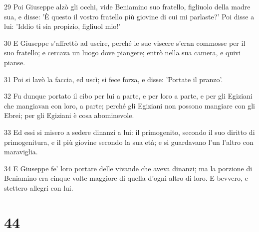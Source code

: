 \par 29 Poi Giuseppe alzò gli occhi, vide Beniamino suo fratello, figliuolo della madre sua, e disse: 'È questo il vostro fratello più giovine di cui mi parlaste?' Poi disse a lui: 'Iddio ti sia propizio, figliuol mio!'
\par 30 E Giuseppe s'affrettò ad uscire, perché le sue viscere s'eran commosse per il suo fratello; e cercava un luogo dove piangere; entrò nella sua camera, e quivi pianse.
\par 31 Poi si lavò la faccia, ed uscì; si fece forza, e disse: 'Portate il pranzo'.
\par 32 Fu dunque portato il cibo per lui a parte, e per loro a parte, e per gli Egiziani che mangiavan con loro, a parte; perché gli Egiziani non possono mangiare con gli Ebrei; per gli Egiziani è cosa abominevole.
\par 33 Ed essi si misero a sedere dinanzi a lui: il primogenito, secondo il suo diritto di primogenitura, e il più giovine secondo la sua età; e si guardavano l'un l'altro con maraviglia.
\par 34 E Giuseppe fe' loro portare delle vivande che aveva dinanzi; ma la porzione di Beniamino era cinque volte maggiore di quella d'ogni altro di loro. E bevvero, e stettero allegri con lui.

\chapter{44}


